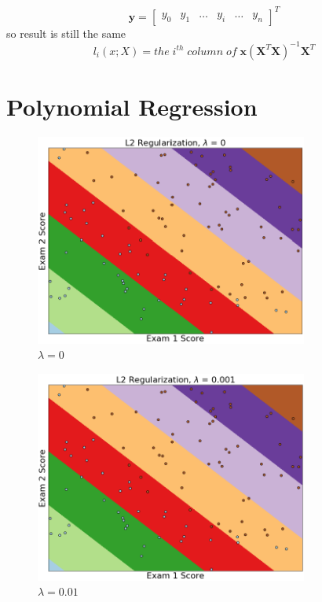 \documentclass{article}
\begin{document}
       	\begin{equation}
       		\boldsymbol{y} = \begin{bmatrix} 
    			y_0&y_1&\dots&y_i&\dots&y_n
    			\end{bmatrix}^T
       	\end{equation}
       	so result is still the same
       	\begin{equation}
            l_i(x; X) = 
    		the \; i^{th} \; column \; of \; \boldsymbol{x} (\boldsymbol{X}^T\boldsymbol{X})^{-1}\boldsymbol{X}^T
        \end{equation}
       
       \section{Polynomial Regression}
        
        \begin{figure}[h]
			\centering
			\includegraphics[width=0.8\textwidth]
            {fig_1.png}
            \caption{$\lambda = 0$}
            \label{fig:1}
		\end{figure}    
		
		\begin{figure}[h]
			\centering
			\includegraphics[width=0.8\textwidth]
            {fig_2.png}
            \caption{$\lambda = 0.01$}
            \label{fig:2}
		\end{figure}    
        
\end{document}
